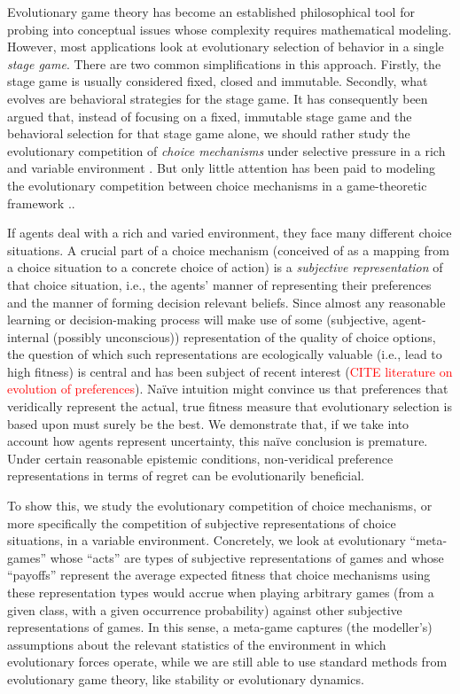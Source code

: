 \documentclass[fleqn,reqno,11pt]{article}
\begin{document}
Evolutionary game theory has become an established philosophical tool for probing into
conceptual issues whose complexity requires mathematical modeling. However, most applications
look at evolutionary selection of behavior in a single \emph{stage game}. There are two common
simplifications in this approach. Firstly, the stage game is usually considered fixed, closed
and immutable. Secondly, what evolves are behavioral strategies for the stage game. It has
consequently been argued that, instead of focusing on a fixed, immutable stage game and the
behavioral selection for that stage game alone, we should rather study the evolutionary
competition of \emph{choice mechanisms} under selective pressure in a rich and variable
environment \citep[e.g.][]{FawcettHamblin2013:Exposing-the-be,McNamara2013:Towards-a-Riche}.
But only little attention has been paid to modeling the evolutionary competition between choice
mechanisms in a game-theoretic framework \citep[but
see][]{ZollmanSmead2010:Plasticity-and-,SmeadZollman2013:The-Stability-o}..

If agents deal with a rich and varied environment, they face many different choice
situations. A crucial part of a choice mechanism (conceived of as a mapping from a choice
situation to a concrete choice of action) is a \emph{subjective representation} of that choice
situation, i.e., the agents' manner of representing their preferences and the manner of forming
decision relevant beliefs. Since almost any reasonable learning or decision-making process will
make use of some (subjective, agent-internal (possibly unconscious)) representation of the
quality of choice options, the question of which such representations are ecologically valuable
(i.e., lead to high fitness) is central and has been subject of recent interest
(\textcolor{red}{CITE literature on evolution of preferences}). Na\"ive intuition might
convince us that preferences that veridically represent the actual, true fitness measure that
evolutionary selection is based upon must surely be the best. We demonstrate that, if we take
into account how agents represent uncertainty, this na\"ive conclusion is premature. Under
certain reasonable epistemic conditions, non-veridical preference representations in terms of
regret can be evolutionarily beneficial.

To show this, we study the evolutionary competition of choice mechanisms, or more specifically
the competition of subjective representations of choice situations, in a variable
environment. Concretely, we look at evolutionary ``meta-games'' whose ``acts'' are types of
subjective representations of games and whose ``payoffs'' represent the average expected
fitness that choice mechanisms using these representation types would accrue when playing
arbitrary games (from a given class, with a given occurrence probability) against other
subjective representations of games. In this sense, a meta-game captures (the modeller's)
assumptions about the relevant statistics of the environment in which evolutionary forces
operate, while we are still able to use standard methods from evolutionary game theory, like
stability or evolutionary dynamics.
\end{document}
